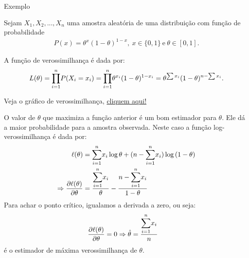 \documentclass[12pt]{beamer}
\begin{document}
\begin{frame}{Exemplo}
\begin{block}{}
\justifying
Sejam $X_1, X_2, ..., X_n$ uma amostra aleatória de uma distribuição com função de probabilidade
\begin{align*}
    P(x)=\theta^{x}(1-\theta)^{1-x},~x\in\{0,1\}~\text{e}~\theta\in[0,1].
\end{align*}
\end{block}
\pause
\begin{block}{}
\justifying
A função de verossimilhança é dada por:
\begin{align*}
    L(\theta)={\displaystyle {\displaystyle \prod_{i=1}^{n}} P(X_{i}=x_{i})={\displaystyle \prod_{i=1}^{n}} \theta^{x_{i}}(1-\theta)^{1-x_{i}}}=\theta^{\sum x_{i}}(1-\theta)^{n-\sum x_{i}}.
\end{align*}
\end{block}
\pause
\begin{block}{}
	Veja o gráfico de verossimilhança,  \href{https://est711.shinyapps.io/Verossimilhanca/}{cliquem aqui!} 
\end{block}
\end{frame}

\begin{frame}{}
    \begin{block}{}
    \justifying
O valor de $\theta$ que maximiza a função anterior é um bom estimador para $\theta.$ Ele dá a maior probabilidade para a amostra observada. Neste caso a função log-verossimilhança é dada por:
\begin{align*}
\ell(\theta)&={\displaystyle \sum_{i=1}^{n}} x_{i}\log{\theta}+(n-{\displaystyle \sum_{i=1}^{n}} x_{i})\log{(1-\theta)}\\
\Rightarrow \dfrac{\partial\ell(\theta)}{\partial\theta}&=\dfrac{{\displaystyle \sum_{i=1}^{n}} x_{i}}{\theta}-\dfrac{n-{\displaystyle \sum_{i=1}^{n}} x_{i}}{1-\theta}
\end{align*}
Para achar o ponto crítico, igualamos a derivada a zero, ou seja:
\begin{align*}
\dfrac{\partial\ell(\theta)}{\partial\theta}=0&\Rightarrow \hat{\theta}=\dfrac{{\displaystyle \sum_{i=1}^{n}} x_{i}}{n}
\end{align*}
é o estimador de máxima verossimilhança de $\theta.$
\end{block}

\end{frame}
\end{document}
